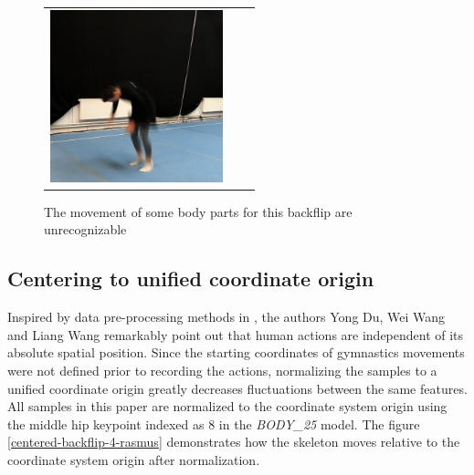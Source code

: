 \begin{figure}
\begin{tabular}{ccc}
\includegraphics[width=5cm]{images/data-preprocessing/unrec-backflip-part-6}\\
\end{tabular}
    \caption{The movement of some body parts for this backflip are unrecognizable}
    \label{example-of-unrecognizable-backflip}
\end{figure}

\subsection{Centering to unified coordinate origin}

Inspired by data pre-processing methods in \cite{hierarchical-rnn-har}, the authors Yong Du, Wei Wang and Liang Wang remarkably point out that human actions are independent of its absolute spatial position. Since the starting coordinates of gymnastics movements were not defined prior to recording the actions, normalizing the samples to a unified coordinate origin greatly decreases fluctuations between the same features. All samples in this paper are normalized to the coordinate system origin using the middle hip keypoint indexed as 8 in the \textit{BODY\_25} model. The figure \ref{centered-backflip-4-rasmus} demonstrates how the skeleton moves relative to the coordinate system origin after normalization.

